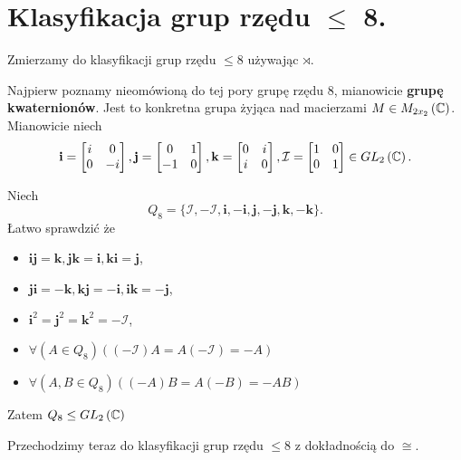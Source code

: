 \section{Klasyfikacja grup rzędu $\le $ 8.}

\begin{context}
Zmierzamy do klasyfikacji grup rzędu $\le 8$ używając $\rtimes$.
\end{context}

Najpierw poznamy nieomówioną do tej pory grupę rzędu 8, mianowicie \textbf{grupę kwaternionów}. Jest to konkretna grupa żyjąca nad macierzami $M\in M_{2x_2}\left( \mathbb{C} \right) $. Mianowicie niech
\[
	\mathbf{i} =\begin{bmatrix} i & 0 \\0&-i \end{bmatrix}, \mathbf{j} = \begin{bmatrix} 0&1 \\ -1& 0 \end{bmatrix}, \mathbf{k} = \begin{bmatrix} 0 & i \\ i & 0 \end{bmatrix}, \mathcal{I} = \begin{bmatrix} 1 & 0 \\ 0 & 1 \end{bmatrix}  \in GL_2\left( \mathbb{C} \right) 
.\] 

Niech \[
Q_{8} = \{\mathcal{I}, -\mathcal{I}, \mathbf{i} , -\mathbf{i}, \mathbf{j}, -\mathbf{j} , \mathbf{k}, -\mathbf{k}  \} 
.\] 
Łatwo sprawdzić że
\begin{itemize}
	\item $\mathbf{i} \mathbf{j} = \mathbf{k}, \mathbf{j} \mathbf{k} = \mathbf{i}, \mathbf{k} \mathbf{i} = \mathbf{j} $,
	\item $\mathbf{j} \mathbf{i} = -\mathbf{k}, \mathbf{k} \mathbf{j} = -\mathbf{i}, \mathbf{i} \mathbf{k} = -\mathbf{j} $,
	\item  $\mathbf{i} ^{2} = \mathbf{j} ^{2} = \mathbf{k} ^2 = -\mathcal{I}$,
	\item $\forall\left(A\in Q_8\right) \left( \left( -\mathcal{I} \right) A = A\left( -\mathcal{I} \right) = -A \right) $
	\item $\forall\left(A,B \in Q_8\right)\left( \left( -A \right) B = A\left( -B \right) = -AB \right)  $
\end{itemize}

Zatem $Q_8 \le GL_{2}\left( \mathbb{C} \right) $

Przechodzimy teraz do klasyfikacji grup rzędu $\le 8$ z dokładnością do $\cong$.

